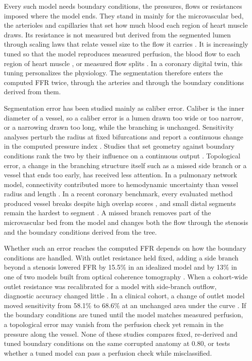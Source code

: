 \documentclass[journal,twoside,web]{ieeecolor}
\begin{document}
Every such model needs boundary conditions, the pressures, flows or resistances imposed where the model ends. They
stand in mainly for the microvascular bed, the arterioles and capillaries that set how much blood each region of heart
muscle draws. Its resistance is not measured but derived from the segmented lumen through
scaling laws that relate vessel size to the flow it carries \cite{murray1926,kim2010}. It is increasingly tuned so that the model reproduces measured perfusion, the blood flow to each region of heart
muscle \cite{menon2024}, or measured flow splits \cite{arminio2026}. In a coronary digital twin, this tuning personalizes the physiology. The segmentation therefore enters the computed FFR twice, through the arteries and through the boundary conditions derived from them.

Segmentation error has been studied mainly as caliber error. Caliber is the inner diameter of a vessel, so a caliber error is a lumen drawn too wide or too narrow, or a narrowing drawn too long, while the branching is unchanged. Sensitivity analyses perturb the radius at fixed bifurcations and report a continuous change in the computed pressure index \cite{sankaran2015tmi,sankaran2015cmame,fernandez2024,dalmaso2025}. Studies that set geometry against
boundary conditions rank the two by their influence on a continuous output \cite{sankaran2016,tanade2022,korte2023}. Topological error, a change in the branching structure itself such as a missed side branch or a vessel that ends too early, has received less attention. In a pulmonary network model, connectivity contributed more to hemodynamic uncertainty than vessel radius and
length \cite{colebank2019}. In a recent coronary benchmark, every evaluated method produced vessel breaks despite high overlap scores \cite{bransby2026}, and small distal segments remain the hardest to segment
\cite{chen2025}. A missed branch removes part of the microvascular bed from the model and changes both the flow
through the stenosis and the boundary conditions derived from the tree.

Whether such an error reaches the computed FFR depends on how the boundary conditions are handled. With outlet resistance held fixed, adding a side branch beyond a stenosis lowered FFR by 15.5\% in an idealized model and by 13\% in one of two models built from optical coherence tomography \cite{gamage2022}. When a cohort-wide outlet resistance was recalibrated for a model with side-branch outflow, diagnostic accuracy changed little \cite{gosling2020}. In a clinical cohort, a change of outlet model moved sensitivity from 58.1\% to 68.6\% at an unchanged area under
the curve \cite{fossan2026}. If the boundary conditions are tuned until the model matches measured perfusion, a topological error may vanish
from the perfusion check yet remain in the pressure along the vessel. None of these studies compares fixed, re-derived and tuned boundary conditions on the same corrupted anatomy at
0.80, or tests whether a tuned model can pass a perfusion check while misclassified.
\end{document}
